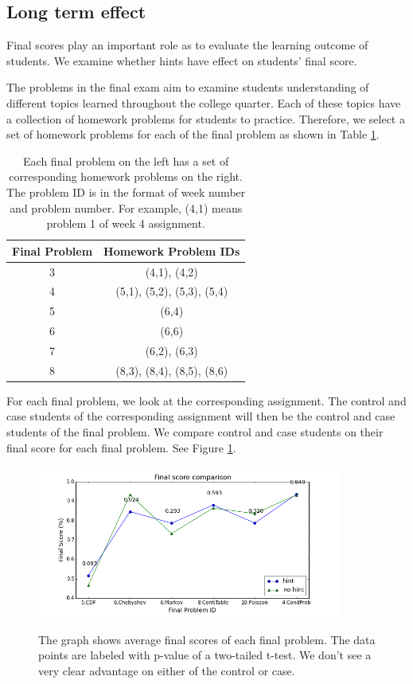 \documentclass{llncs2e/llncs}
\begin{document}
\subsection{Long term effect}
Final scores play an important role as to evaluate the learning outcome of students. We examine whether hints have effect on students' final score.

The problems in the final exam aim to examine students understanding of different topics learned throughout the college quarter. Each of these topics have a collection of homework problems for students to practice. Therefore, we select a set of homework problems for each of the final problem as shown in Table \ref{tab:map}.

\begin{table}[h]
\caption{Each final problem on the left has a set of corresponding homework problems on the right. The problem ID is in the format of week number and problem number. For example, (4,1) means problem 1 of week 4 assignment.}
\begin{center}
  \begin{tabular}{ c | c }
   Final Problem & Homework Problem IDs \\ \hline
	3 & (4,1), (4,2) \\
	4 & (5,1), (5,2), (5,3), (5,4) \\
    5 & (6,4) \\
    6 & (6,6) \\
    7 & (6,2), (6,3) \\
    8 & (8,3), (8,4), (8,5), (8,6) \\ \hline
  \end{tabular}
  \label{tab:map}
  \end{center}
\end{table}

For each final problem, we look at the corresponding assignment. The control and case students of the corresponding assignment will then be the control and case students of the final problem. We compare control and case students on their final score for each final problem. See Figure \ref{fig:final_compare_all}.

\begin{figure}[h]
\centering
\caption{The graph shows average final scores of each final problem. The data points are labeled with p-value of a two-tailed t-test. We don't see a very clear advantage on either of the control or case.}
\includegraphics[width=0.8\linewidth, height=5cm]{image/final_compare.png}
\label{fig:final_compare_all}
\end{figure}
\end{document}

